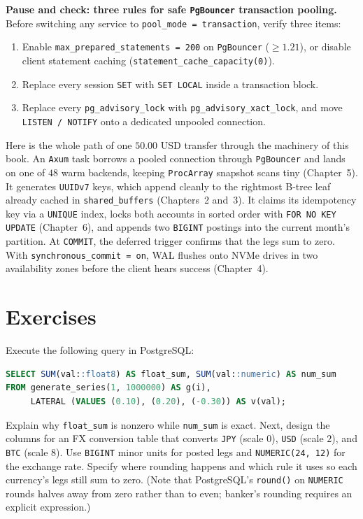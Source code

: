 \begin{recoverybox}
\textbf{Pause and check: three rules for safe \texttt{PgBouncer} transaction pooling.}
Before switching any service to \texttt{pool\_mode = transaction}, verify three items:
\begin{enumerate}
  \item Enable \texttt{max\_prepared\_statements = 200} on \texttt{PgBouncer} ($\ge 1.21$), or disable client statement caching (\texttt{statement\_cache\_capacity(0)}).
  \item Replace every session \texttt{SET} with \texttt{SET LOCAL} inside a transaction block.
  \item Replace every \texttt{pg\_advisory\_lock} with \texttt{pg\_advisory\_xact\_lock}, and move \texttt{LISTEN / NOTIFY} onto a dedicated unpooled connection.
\end{enumerate}
\end{recoverybox}

Here is the whole path of one $50.00\text{ USD}$ transfer through the machinery of
this book. An \texttt{Axum} task borrows a pooled connection through
\texttt{PgBouncer} and lands on one of $48$ warm backends, keeping
\texttt{ProcArray} snapshot scans tiny (Chapter~5). It generates \texttt{UUIDv7}
keys, which append cleanly to the rightmost B-tree leaf already cached in
\texttt{shared\_buffers} (Chapters~2 and~3). It claims its idempotency key via a
\texttt{UNIQUE} index, locks both accounts in sorted order with
\texttt{FOR NO KEY UPDATE} (Chapter~6), and appends two \texttt{BIGINT} postings
into the current month's partition. At \texttt{COMMIT}, the deferred trigger
confirms that the legs sum to zero. With \texttt{synchronous\_commit = on}, WAL
flushes onto NVMe drives in two availability zones before the client hears success
(Chapter~4).

\section{Exercises}
\label{ch08:exercises}

\begin{exercise}
Execute the following query in PostgreSQL:
\begin{lstlisting}[language=SQL]
SELECT SUM(val::float8) AS float_sum, SUM(val::numeric) AS num_sum
FROM generate_series(1, 1000000) AS g(i),
     LATERAL (VALUES (0.10), (0.20), (-0.30)) AS v(val);
\end{lstlisting}
Explain why \texttt{float\_sum} is nonzero while \texttt{num\_sum} is exact. Next,
design the columns for an FX conversion table that converts \texttt{JPY} (scale
$0$), \texttt{USD} (scale $2$), and \texttt{BTC} (scale $8$). Use \texttt{BIGINT}
minor units for posted legs and \texttt{NUMERIC(24, 12)} for the exchange rate.
Specify where rounding happens and which rule it uses so each currency's legs still
sum to zero. (Note that PostgreSQL's \texttt{round()} on \texttt{NUMERIC} rounds
halves away from zero rather than to even; banker's rounding requires an explicit
expression.)
\end{exercise}

